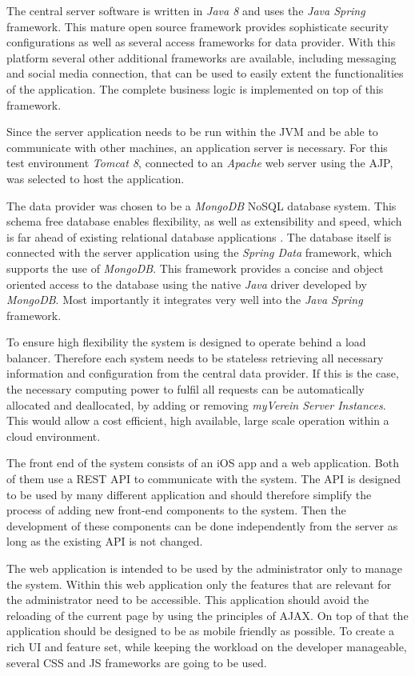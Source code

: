 The central server software is written in \emph{Java 8} and uses the \emph{Java Spring} framework. This mature open source framework provides sophisticate security configurations as well as several access frameworks for data provider. With this platform several other additional frameworks are available, including messaging and social media connection, that can be used to easily extent the functionalities of the application. The complete business logic is implemented on top of this framework.

Since the server application needs to be run within the \gls{JVM} and be able to communicate with other machines, an application server is necessary. For this test environment \emph{Tomcat 8}, connected to an \emph{Apache} web server using the \gls{AJP}, was selected to host the application.  

The data provider was chosen to be a \emph{MongoDB} \gls{NoSQL} database system. This schema free database enables flexibility, as well as extensibility and speed, which is far ahead of existing relational database applications \cite{Moschetti:2014aa}. The database itself is connected with the server application using the \emph{Spring Data} framework, which supports the use of \emph{MongoDB}. This framework provides a concise and object oriented access to the database using the native \emph{Java} driver developed by \emph{MongoDB}. Most importantly it integrates very well into the \emph{Java Spring} framework.

To ensure high flexibility the system is designed to operate behind a load balancer. Therefore each system needs to be stateless retrieving all necessary information and configuration from the central data provider. If this is the case, the necessary computing power to fulfil all requests can be automatically allocated and deallocated, by adding or removing \emph{myVerein Server Instances}. This would allow a cost efficient, high available, large scale operation within a cloud environment.  

The front end of the system consists of an iOS app and a web application. Both of them use a \gls{REST} \gls{API} to communicate with the system. The \gls{API} is designed to be used by many different application and should therefore simplify the process of adding new front-end components to the system. Then the development of these components can be done independently from the server as long as the existing \gls{API} is not changed.

The web application is intended to be used by the administrator only to manage the system. Within this web application only the features that are relevant for the administrator need to be accessible. This application should avoid the reloading of the current page by using the principles of \gls{AJAX}. On top of that the application should be designed to be as mobile friendly as possible. To create a rich \gls{UI} and feature set, while keeping the workload on the developer manageable, several \gls{CSS} and \gls{JS} frameworks are going to be used.

